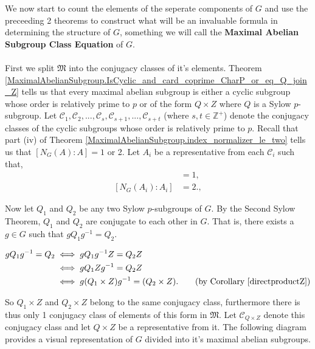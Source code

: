 We now start to count the elements of the seperate components of $G$ and use the preceeding 2 theorems to construct what will be an invaluable formula in determining the structure of $G$, something we will call the \textbf{Maximal Abelian Subgroup Class Equation} of $G$. \\
\\
First we split $\mathfrak{M}$ into the conjugacy classes of it's elements. Theorem \ref{MaximalAbelianSubgroup.IsCyclic_and_card_coprime_CharP_or_eq_Q_join_Z} tells us that every maximal abelian subgroup is either a cyclic subgroup whose order is relatively prime to $p$ or of the form $Q \times Z$ where $Q$ is a Sylow $p$-subgroup. Let $\mathcal{C}_1, \mathcal{C}_2,...,\mathcal{C}_s, \mathcal{C}_{s+1},..., \mathcal{C}_{s+t}$ (where $s, t \in \mathbb{Z}^+$) denote the conjugacy classes of the cyclic subgroups whose order is relatively prime to $p$. Recall that part (iv) of Theorem \ref{MaximalAbelianSubgroup.index_normalizer_le_two} tells us that $[N_G(A): A] = 1$ or 2. Let $A_i$ be a representative from each $\mathcal{C}_i$ such that,
\begin{align*} [N_G(A_i) : A_i] &= 1, \tag{for  $i \leq s$} \\[2mm]
[N_G(A_i) : A_i] &= 2. \tag{for  $s < i \leq s+t$}, \end{align*}

Now let $Q_1$ and $Q_2$ be any two Sylow $p$-subgroups of $G$. By the Second Sylow Theorem, $Q_1$ and $Q_2$ are conjugate to each other in $G$. That is, there exists a $g \in G$ such that $gQ_1g^{-1} = Q_2$.

\begin{align*} gQ_1g^{-1} = Q_2 &\iff gQ_1g^{-1}Z = Q_2Z 
\\ &\iff gQ_1Zg^{-1} = Q_2Z
\\ &\iff g(Q_1 \times Z)g^{-1} = (Q_2 \times Z). \tag{by Corollary \ref{directproductZ}}
\end{align*} 

So $Q_1 \times Z$ and $Q_2 \times Z$ belong to the same conjugacy class, furthermore there is thus only 1 conjugacy class of elements of this form in $\mathfrak{M}$. Let $\mathcal{C}_{Q \times Z}$ denote this conjugacy class and let $Q \times Z$ be a representative from it. The following diagram provides a visual representation of $G$ divided into it's maximal abelian subgroups.


